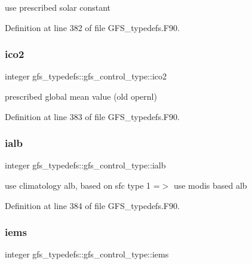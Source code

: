 use prescribed solar constant 



Definition at line 382 of file G\+F\+S\+\_\+typedefs.\+F90.

\mbox{\label{structgfs__typedefs_1_1gfs__control__type_ab76d98e99d4e821ddb93ff8657ccf0d0}} 
\subsubsection{ico2}
{\footnotesize\ttfamily integer gfs\+\_\+typedefs\+::gfs\+\_\+control\+\_\+type\+::ico2}



prescribed global mean value (old opernl) 



Definition at line 383 of file G\+F\+S\+\_\+typedefs.\+F90.

\mbox{\label{structgfs__typedefs_1_1gfs__control__type_a2314615883aba016bf828ba2aae8026d}} 
\subsubsection{ialb}
{\footnotesize\ttfamily integer gfs\+\_\+typedefs\+::gfs\+\_\+control\+\_\+type\+::ialb}



use climatology alb, based on sfc type 1 =$>$ use modis based alb 



Definition at line 384 of file G\+F\+S\+\_\+typedefs.\+F90.

\mbox{\label{structgfs__typedefs_1_1gfs__control__type_a2f107854ff120604f0d8589ae9c74314}} 
\subsubsection{iems}
{\footnotesize\ttfamily integer gfs\+\_\+typedefs\+::gfs\+\_\+control\+\_\+type\+::iems}



